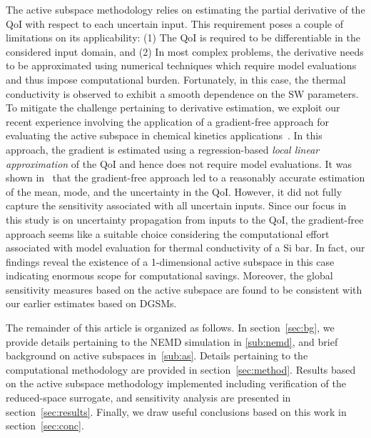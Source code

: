 The active subspace methodology relies on estimating the partial derivative of the QoI 
with respect to each uncertain input. This requirement poses a couple of limitations on its
applicability: (1) The QoI is required to be differentiable in the considered input domain, and (2)
In most complex problems, the derivative needs to be approximated using numerical techniques
which require model evaluations and thus impose computational burden. Fortunately, in this case,
the thermal conductivity is observed to exhibit a smooth dependence on the SW parameters. 
To mitigate the challenge pertaining to derivative estimation, we exploit our recent experience
involving the application of a gradient-free approach for evaluating the active subspace in
chemical kinetics applications~\cite{Vohra:2018c}. In this approach, the gradient is estimated
using a regression-based \textit{local linear approximation} of the QoI and hence does not require
model evaluations. It was shown in~\cite{Vohra:2018c} that the gradient-free approach
led to a reasonably accurate estimation of the mean, mode, and the uncertainty in the QoI.
However, it did not fully capture the sensitivity associated with all uncertain inputs. Since our focus
in this study is on uncertainty propagation from inputs to the QoI, the gradient-free approach
seems like a suitable choice considering the computational effort associated with model 
evaluation for thermal conductivity of a Si bar. In fact, our findings reveal the existence of a 
1-dimensional active subspace in this case indicating enormous scope for computational savings.
Moreover, the global sensitivity measures based
on the active subspace are found to be consistent with our earlier estimates based on DGSMs. 

The remainder of this article is organized as follows. In section~\ref{sec:bg}, we provide details
pertaining to the NEMD simulation in \ref{sub:nemd}, and brief background on active subspaces
in~\ref{sub:as}. Details pertaining to the computational methodology are
provided in section~\ref{sec:method}. Results based on the active subspace methodology
implemented including verification of the reduced-space surrogate, and sensitivity analysis
are presented in section~\ref{sec:results}. Finally, we draw useful conclusions based on this
work in section~\ref{sec:conc}.
































